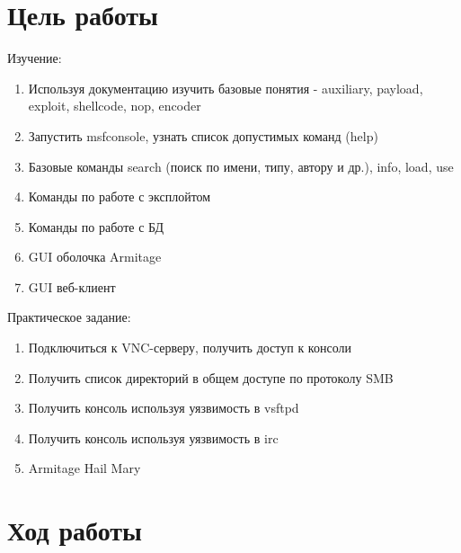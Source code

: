 \section{Цель работы}
Изучение:
\begin{enumerate}
	\item Используя документацию изучить базовые понятия - auxiliary,
	payload, exploit, shellcode, nop, encoder
	\item Запустить msfconsole, узнать список допустимых команд (help)
	\item Базовые команды search (поиск по имени, типу, автору и др.),
	info, load, use
	\item Команды по работе с эксплойтом
	\item Команды по работе с БД
	\item GUI оболочка Armitage
	\item GUI веб-клиент
\end{enumerate}

Практическое задание:
\begin{enumerate}
\item Подключиться к VNC-серверу, получить доступ к консоли
\item Получить список директорий в общем доступе по протоколу SMB
\item Получить консоль используя уязвимость в vsftpd
\item Получить консоль используя уязвимость в irc
\item Armitage Hail Mary
\end{enumerate}

\section{Ход работы}

